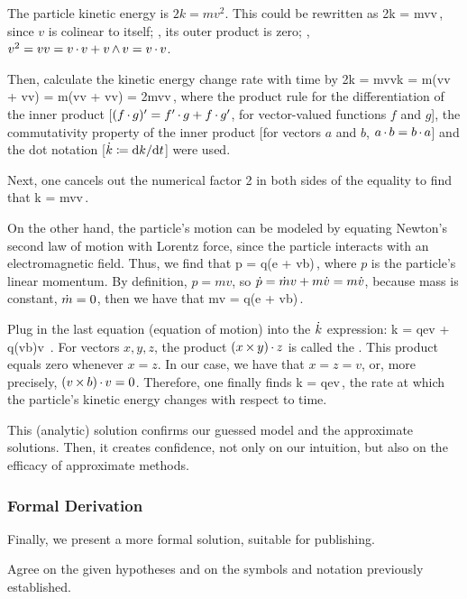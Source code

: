 The particle kinetic energy is $2k = mv^2$. This could be rewritten as 
\beq
2k = mv\iprod v\,, 
\eeq
since $v$ is colinear to itself; \ie, its outer product is zero; \viz, $v^2 = vv = {v}\operatorname{\cdot}{v} + {v}\operatorname{\wedge}{v} = v\operatorname{\cdot} v$. 

Then, calculate the kinetic energy change rate with time by
\beq
2k = mv\iprod v\dt k = m(\dt v\iprod v + v\iprod\dt v) 
                               = m(\dt v\iprod v + \dt v\iprod v) 
                               = 2m\dt v\iprod v\,,
\eeq
where the product rule for the differentiation of the inner product [$(f\operatorname{\cdot} g)' = f'\operatorname{\cdot} g + f\operatorname{\cdot} g'$, for vector-valued functions $f$ and $g$], the commutativity property of the inner product [for vectors $a$ and $b$, $a\operatorname{\cdot} b = b\operatorname{\cdot} a$] and the dot notation [$\dot{k}\coloneqq \text{d} k/\text{d} t$] were used. 

Next, one cancels out the numerical factor 2 in both sides of the equality to find that
\beq
\dt k = m\dt v\iprod v\,.
\eeq

On the other hand, the particle's motion can be modeled by equating Newton's second law of motion with Lorentz force, since the particle interacts with an electromagnetic field. Thus, we find that 
\beq
\dt p = q(e + v\cprod b)\,,
\eeq
where $p$ is the particle's linear momentum. By definition, $p = mv$, so $\dot{p} = \dot{m}v + m\dot{v} = m\dot{v}$, because mass is constant, $\dot{m} = 0$, then we have that
\beq
m\dt v = q(e + v\cprod b)\,.
\eeq

Plug in the last equation (equation of motion) into the $\dot{k}$ expression:
\beq
\dt k = qe\iprod v + q(v\cprod b)\iprod v \,. 
\eeq
For vectors $x,y,z$, the product $(x\operatorname{\times} y)\operatorname{\cdot} z$ is called the . This product equals zero whenever $x = z$. In our case, we have that $x = z = v$, or, more precisely, $(v\operatorname{\times} b)\operatorname{\cdot} v = 0$. Therefore, one finally finds
\beq
\dt k = qe\iprod v\,,
\eeq
the rate at which the particle's kinetic energy changes with respect to time.

This (analytic) solution confirms our guessed model and the approximate solutions. Then, it creates confidence, not only on our intuition, but also on the efficacy of approximate methods.


\subsubsection{Formal Derivation}
Finally, we present a more formal solution, suitable for publishing.

Agree on the given hypotheses and on the symbols and notation previously established.

